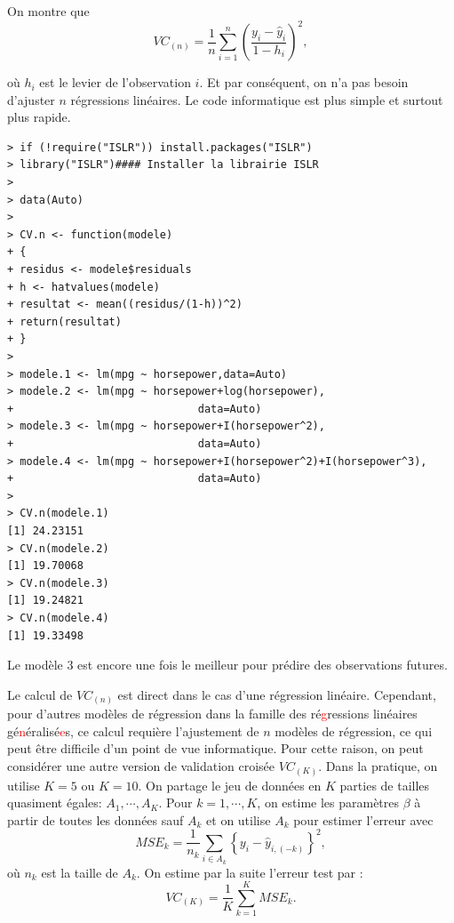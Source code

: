 \documentclass[11pt]{article}
\begin{document}
\noindent On montre que $$VC_{(n)} = \frac{1}{n}  \sum\limits_{i=1}^n \left(\frac{y_i-\hat y_i}{1-h_i}\right)^2,$$

\noindent o\`u $h_i$ est le levier de l'observation $i$. Et par cons\'equent, on n'a pas besoin d'ajuster $n$ r\'egressions lin\'eaires. Le code informatique est plus simple et surtout plus rapide.
\begin{verbatim}
> if (!require("ISLR")) install.packages("ISLR")
> library("ISLR")#### Installer la librairie ISLR
> 
> data(Auto)
> 
> CV.n <- function(modele)
+ {
+ residus <- modele$residuals
+ h <- hatvalues(modele)
+ resultat <- mean((residus/(1-h))^2)
+ return(resultat)
+ }
> 
> modele.1 <- lm(mpg ~ horsepower,data=Auto)
> modele.2 <- lm(mpg ~ horsepower+log(horsepower),
+                             data=Auto)
> modele.3 <- lm(mpg ~ horsepower+I(horsepower^2),
+                             data=Auto)
> modele.4 <- lm(mpg ~ horsepower+I(horsepower^2)+I(horsepower^3),
+                             data=Auto)
> 
> CV.n(modele.1)
[1] 24.23151
> CV.n(modele.2)
[1] 19.70068
> CV.n(modele.3)
[1] 19.24821
> CV.n(modele.4)
[1] 19.33498
\end{verbatim}

\noindent Le mod\`ele 3 est encore une fois le meilleur pour pr\'edire des observations futures.

\noindent Le calcul de $VC_{(n)}$ est direct dans le cas d'une r\'egression lin\'eaire. Cependant, pour d'autres mod\`eles de r\'egression dans la famille des r\'e\textcolor{red}{g}ressions lin\'eaires g\'e\textcolor{red}{n}\'eralis\'e\textcolor{red}{e}s, ce calcul requi\`ere l'ajustement de $n$ mod\`eles de r\'egression, ce qui peut \^etre difficile d'un point de vue informatique. Pour cette raison, on peut consid\'erer une autre version de validation crois\'ee $VC_{(K)}$. Dans la pratique, on utilise $K=5$ ou $K=10$. On partage le jeu de donn\'ees en $K$ parties de tailles quasiment \'egales: $A_1,\cdots,A_K$. Pour $k=1,\cdots,K$, on estime les param\`etres $\beta$ \`a partir de toutes les donn\'ees sauf $A_k$ et on utilise $A_k$ pour estimer l'erreur avec
$$MSE_k = \frac{1}{n_k} \sum_{i \in A_k} \left\{y_i-\hat y_{i,(-k)}\right\}^2,$$
o\`u $n_k$ est la taille de $A_k$. On estime par la suite l'erreur test par :
$$VC_{(K)} = \frac{1}{K}  \sum\limits_{k=1}^K MSE_k.$$
\end{document}
